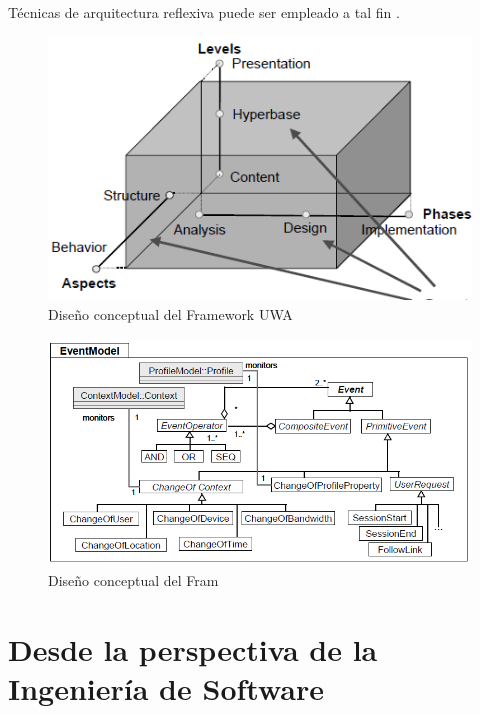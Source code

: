 Técnicas de arquitectura reflexiva puede ser empleado a tal fin \cite{uwa.reflective}.

\begin{figure}[t]
\begin{center}
 \includegraphics[width=5 in,totalheight=3 in]
{Ch1/Figuras/ScopeCustomisation.png}
\caption{Dise\~no conceptual del Framework UWA}\label{uwaFramework}
\end{center}
\end{figure}


\begin{figure}[t]
\begin{center}
 \includegraphics[width=4 in,totalheight=3 in]
{Ch1/Figuras/UWAEventModel.png}
\caption{Dise\~no conceptual del Fram}\label{uwaFramework}
\end{center}
\end{figure}



\section{Desde la perspectiva de la Ingeniería de Software}
 
